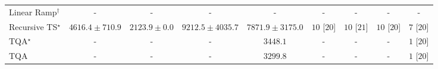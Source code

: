 \begin{tabular}{l|cccc|cccc|}
Linear Ramp$^\dagger$ & {\cellcolor[HTML]{000000}} \color[HTML]{F1F1F1} {\cellcolor{white}} \color{black} - & {\cellcolor[HTML]{000000}} \color[HTML]{F1F1F1} {\cellcolor{white}} \color{black} - & {\cellcolor[HTML]{000000}} \color[HTML]{F1F1F1} {\cellcolor{white}} \color{black} - & {\cellcolor[HTML]{000000}} \color[HTML]{F1F1F1} {\cellcolor{white}} \color{black} - & {\cellcolor[HTML]{000000}} \color[HTML]{F1F1F1} {\cellcolor{white}} \color{black} - & {\cellcolor[HTML]{000000}} \color[HTML]{F1F1F1} {\cellcolor{white}} \color{black} - & {\cellcolor[HTML]{000000}} \color[HTML]{F1F1F1} {\cellcolor{white}} \color{black} - & {\cellcolor[HTML]{000000}} \color[HTML]{F1F1F1} {\cellcolor{white}} \color{black} - \\
Recursive TS$^\star$ & {\cellcolor[HTML]{9CB9D9}} \color[HTML]{000000} $4616.4\pm 710.9$ & {\cellcolor[HTML]{F4EDF6}} \color[HTML]{000000} $2123.9\pm 0.0$ & {\cellcolor[HTML]{023858}} \color[HTML]{F1F1F1} $9212.5\pm 4035.7$ & {\cellcolor[HTML]{04629A}} \color[HTML]{F1F1F1} $7871.9\pm 3175.0$ & {\cellcolor[HTML]{49006A}} \color[HTML]{F1F1F1} $10$ [$20$] & {\cellcolor[HTML]{49006A}} \color[HTML]{F1F1F1} $10$ [$21$] & {\cellcolor[HTML]{49006A}} \color[HTML]{F1F1F1} $10$ [$20$] & {\cellcolor[HTML]{CD238F}} \color[HTML]{F1F1F1} $7$ [$20$] \\
TQA$^\star$ & {\cellcolor[HTML]{000000}} \color[HTML]{F1F1F1} {\cellcolor{white}} \color{black} - & {\cellcolor[HTML]{000000}} \color[HTML]{F1F1F1} {\cellcolor{white}} \color{black} - & {\cellcolor[HTML]{000000}} \color[HTML]{F1F1F1} {\cellcolor{white}} \color{black} - & {\cellcolor[HTML]{D1D2E6}} \color[HTML]{000000} $3448.1$ & {\cellcolor[HTML]{000000}} \color[HTML]{F1F1F1} {\cellcolor{white}} \color{black} - & {\cellcolor[HTML]{000000}} \color[HTML]{F1F1F1} {\cellcolor{white}} \color{black} - & {\cellcolor[HTML]{000000}} \color[HTML]{F1F1F1} {\cellcolor{white}} \color{black} - & {\cellcolor[HTML]{FFF7F3}} \color[HTML]{000000} $1$ [$20$] \\
TQA & {\cellcolor[HTML]{000000}} \color[HTML]{F1F1F1} {\cellcolor{white}} \color{black} - & {\cellcolor[HTML]{000000}} \color[HTML]{F1F1F1} {\cellcolor{white}} \color{black} - & {\cellcolor[HTML]{000000}} \color[HTML]{F1F1F1} {\cellcolor{white}} \color{black} - & {\cellcolor[HTML]{D5D5E8}} \color[HTML]{000000} $3299.8$ & {\cellcolor[HTML]{000000}} \color[HTML]{F1F1F1} {\cellcolor{white}} \color{black} - & {\cellcolor[HTML]{000000}} \color[HTML]{F1F1F1} {\cellcolor{white}} \color{black} - & {\cellcolor[HTML]{000000}} \color[HTML]{F1F1F1} {\cellcolor{white}} \color{black} - & {\cellcolor[HTML]{FFF7F3}} \color[HTML]{000000} $1$ [$20$] \\

\end{tabular}
